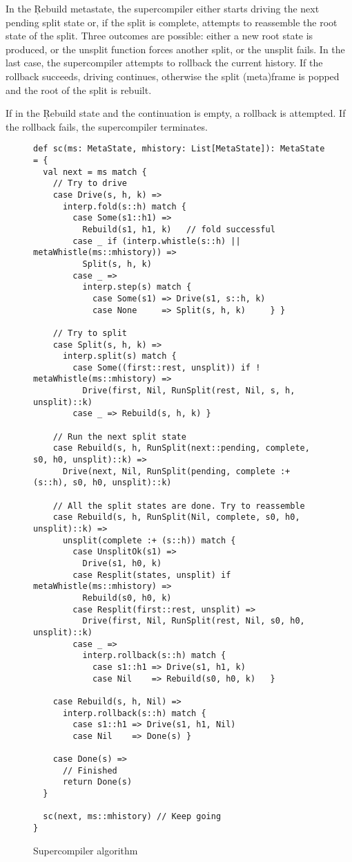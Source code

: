 In the \c{Rebuild} metastate, the supercompiler
either starts driving the next pending split state 
or, if the split is complete, attempts to reassemble the root
state of the split. Three outcomes are possible: either a
new root state is produced, or the unsplit function forces
another split, or the unsplit fails.
In the last case, the supercompiler attempts to rollback
the current history. If the rollback succeeds, driving continues,
otherwise the split (meta)frame is popped and 
the root of the split is rebuilt.

If in the \c{Rebuild} state and the continuation is empty,
a rollback is attempted. If the rollback fails, the supercompiler
terminates.

\begin{figure*}
  \begin{verbatim}
def sc(ms: MetaState, mhistory: List[MetaState]): MetaState = {
  val next = ms match {
    // Try to drive
    case Drive(s, h, k) =>
      interp.fold(s::h) match {
        case Some(s1::h1) =>
          Rebuild(s1, h1, k)   // fold successful
        case _ if (interp.whistle(s::h) || metaWhistle(ms::mhistory)) =>
          Split(s, h, k)
        case _ =>
          interp.step(s) match {
            case Some(s1) => Drive(s1, s::h, k)
            case None     => Split(s, h, k)     } }

    // Try to split
    case Split(s, h, k) =>
      interp.split(s) match {
        case Some((first::rest, unsplit)) if ! metaWhistle(ms::mhistory) =>
          Drive(first, Nil, RunSplit(rest, Nil, s, h, unsplit)::k)
        case _ => Rebuild(s, h, k) }

    // Run the next split state
    case Rebuild(s, h, RunSplit(next::pending, complete, s0, h0, unsplit)::k) =>
      Drive(next, Nil, RunSplit(pending, complete :+ (s::h), s0, h0, unsplit)::k)

    // All the split states are done. Try to reassemble
    case Rebuild(s, h, RunSplit(Nil, complete, s0, h0, unsplit)::k) =>
      unsplit(complete :+ (s::h)) match {
        case UnsplitOk(s1) =>
          Drive(s1, h0, k)
        case Resplit(states, unsplit) if metaWhistle(ms::mhistory) =>
          Rebuild(s0, h0, k)
        case Resplit(first::rest, unsplit) =>
          Drive(first, Nil, RunSplit(rest, Nil, s0, h0, unsplit)::k)
        case _ =>
          interp.rollback(s::h) match {
            case s1::h1 => Drive(s1, h1, k)
            case Nil    => Rebuild(s0, h0, k)   }

    case Rebuild(s, h, Nil) =>
      interp.rollback(s::h) match {
        case s1::h1 => Drive(s1, h1, Nil)
        case Nil    => Done(s) }

    case Done(s) =>
      // Finished
      return Done(s)
  }

  sc(next, ms::mhistory) // Keep going
}
  \end{verbatim}
  \caption{Supercompiler algorithm}
  \label{fig:sc}
\end{figure*}



